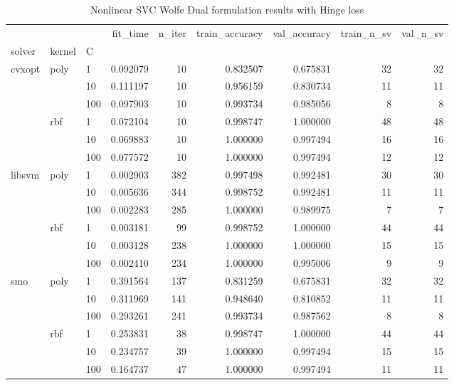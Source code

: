 \begin{table}[H]
\centering
\caption{Nonlinear SVC Wolfe Dual formulation results with Hinge loss}
\label{nonlinear_dual_svc_cv_results}
\begin{tabular}{lllrrrrrr}
\toprule
    &     &     &  fit\_time &  n\_iter &  train\_accuracy &  val\_accuracy &  train\_n\_sv &  val\_n\_sv \\
solver & kernel & C &           &         &                 &               &             &           \\
\midrule
cvxopt & poly & 1   &  0.092079 &      10 &        0.832507 &      0.675831 &          32 &        32 \\
    &     & 10  &  0.111197 &      10 &        0.956159 &      0.830734 &          11 &        11 \\
    &     & 100 &  0.097903 &      10 &        0.993734 &      0.985056 &           8 &         8 \\
    & rbf & 1   &  0.072104 &      10 &        0.998747 &      1.000000 &          48 &        48 \\
    &     & 10  &  0.069883 &      10 &        1.000000 &      0.997494 &          16 &        16 \\
    &     & 100 &  0.077572 &      10 &        1.000000 &      0.997494 &          12 &        12 \\
libsvm & poly & 1   &  0.002903 &     382 &        0.997498 &      0.992481 &          30 &        30 \\
    &     & 10  &  0.005636 &     344 &        0.998752 &      0.992481 &          11 &        11 \\
    &     & 100 &  0.002283 &     285 &        1.000000 &      0.989975 &           7 &         7 \\
    & rbf & 1   &  0.003181 &      99 &        0.998752 &      1.000000 &          44 &        44 \\
    &     & 10  &  0.003128 &     238 &        1.000000 &      1.000000 &          15 &        15 \\
    &     & 100 &  0.002410 &     234 &        1.000000 &      0.995006 &           9 &         9 \\
smo & poly & 1   &  0.391564 &     137 &        0.831259 &      0.675831 &          32 &        32 \\
    &     & 10  &  0.311969 &     141 &        0.948640 &      0.810852 &          11 &        11 \\
    &     & 100 &  0.293261 &     241 &        0.993734 &      0.987562 &           8 &         8 \\
    & rbf & 1   &  0.253831 &      38 &        0.998747 &      1.000000 &          44 &        44 \\
    &     & 10  &  0.234757 &      39 &        1.000000 &      0.997494 &          15 &        15 \\
    &     & 100 &  0.164737 &      47 &        1.000000 &      0.997494 &          11 &        11 \\
\bottomrule
\end{tabular}
\end{table}
